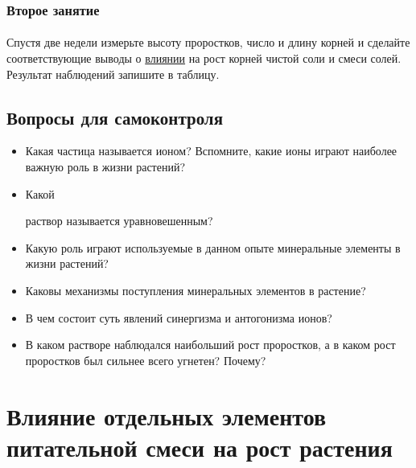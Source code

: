 	\subsubsection*{Второе занятие}
	
	\paragraph*{}Спустя две недели измерьте высоту проростков, число и длину корней и сделайте соответствующие выводы о \hyperlink{growth_question}{влиянии} на рост корней чистой соли и смеси солей. Результат наблюдений запишите в таблицу. 
	
	\subsection*{Вопросы для самоконтроля}

	\begin{itemize}
		\item Какая частица называется \hypertarget{ion}{ионом}? Вспомните, какие ионы играют наиболее важную роль в жизни растений?
		\item \hypertarget{mixture}{Какой} раствор называется уравновешенным?
		\item Какую роль играют используемые в данном опыте минеральные элементы в жизни растений?
		\item Каковы механизмы поступления минеральных элементов в растение?
		\item В чем состоит суть явлений \hypertarget{sinergism}{синергизма и антогонизма} ионов?
		\item В каком растворе наблюдался наибольший рост \hypertarget{growth_question}{проростков}, а в каком рост проростков был сильнее всего угнетен? Почему? 
	\end{itemize}
	
\section*{\lbtitle Влияние отдельных элементов питательной смеси на рост растения}



